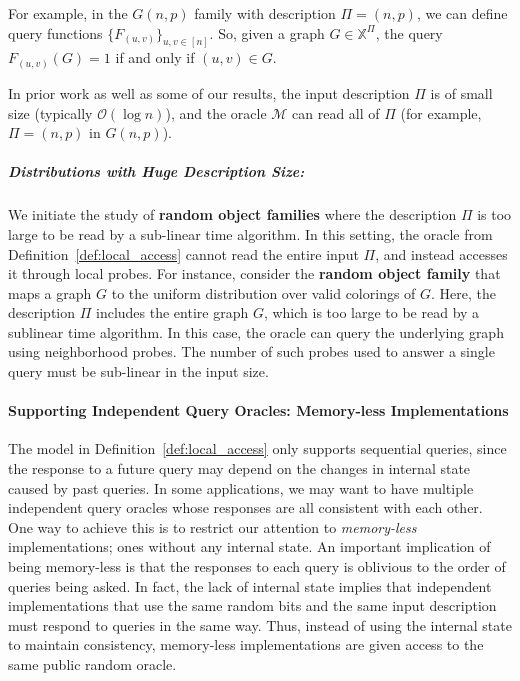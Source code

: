 For example, in the $G(n,p)$ family with description $\Pi = (n, p)$,
we can define  query functions $\{ F_{(u,v)}\}_{u,v\in [n]}$.
So, given a graph $G\in \mathbb X^{\Pi}$, the query $F_{(u,v)}(G) = 1$ if and only if $(u,v)\in G$.

In prior work \cite{reut, huge, sparse} as well as some of our results, the input description $\Pi$ is of small size (typically $\mathcal O(\log n)$),
and the oracle $\mathcal M$ can read all of $\Pi$ (for example, $\Pi = (n, p)$ in $G(n,p)$).

\subparagraph*{{\Large Distributions with Huge Description Size:}}
\label{par:distributions_with_huge_description_size}
We initiate the study of \textbf{random object families} where the description $\Pi$ is too large to be read by a sub-linear time algorithm.
In this setting, the oracle from Definition~\ref{def:local_access} cannot read the entire input $\Pi$, and instead accesses it through local probes.
For instance, consider the \textbf{random object family} that maps a graph $G$ to the uniform distribution over valid colorings of $G$.
Here, the description $\Pi$ includes the entire graph $G$, which is too large to be read by a sublinear time algorithm.
In this case, the oracle can query the underlying graph using neighborhood probes.
The number of such probes used to answer a single query must be sub-linear in the input size.


\paragraph*{Supporting Independent Query Oracles: Memory-less Implementations}
\label{par:supporting_independent_query_oracles_memory_less_implementations}
The model in Definition~\ref{def:local_access} only supports sequential queries,
since the response to a future query may depend on the changes in internal state caused by past queries.
In some applications, we may want to have multiple independent query oracles whose responses are all consistent with each other.
One way to achieve this is to restrict our attention to \emph{memory-less} implementations; ones without any internal state.
An important implication of being memory-less is that the responses to each query is oblivious to the order of queries being asked.
In fact, the lack of internal state implies that independent implementations that use the same random bits and the same input description
must respond to queries in the same way.
Thus, instead of using the internal state to maintain consistency, memory-less implementations are given access to the same public random oracle.

